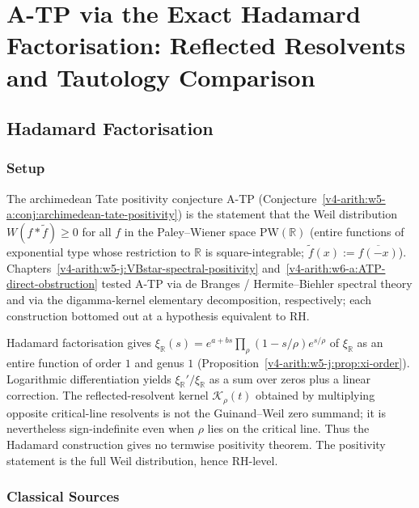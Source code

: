 \chapter{A-TP via the Exact Hadamard Factorisation: Reflected Resolvents and Tautology Comparison}
\label{v4-arith:w7-g:ATP-Hadamard}

\section{Hadamard Factorisation}
\label{v4-arith:w7-g:context}

\subsection{Setup}
\label{v4-arith:w7-g:context:obstruction}

The archimedean Tate positivity conjecture A-TP
(Conjecture~\ref{v4-arith:w5-a:conj:archimedean-tate-positivity}) is the
statement that the Weil distribution \(W(f*\widetilde{f})\geq 0\) for
all \(f\) in the Paley--Wiener space \(\mathrm{PW}(\mathbb{R})\) (entire
functions of exponential type whose restriction to \(\mathbb{R}\) is
square-integrable; \(\widetilde{f}(x):=\overline{f(-x)}\)). Chapters~\ref{v4-arith:w5-j:VBstar-spectral-positivity}
and~\ref{v4-arith:w6-a:ATP-direct-obstruction} tested A-TP via de Branges
/ Hermite--Biehler spectral theory and via the digamma-kernel elementary
decomposition, respectively; each construction bottomed out at a hypothesis
equivalent to RH.

Hadamard factorisation gives
\(\xi_{\mathbb{R}}(s)=e^{a+bs}\prod_{\rho}(1-s/\rho)e^{s/\rho}\)
of \(\xi_{\mathbb{R}}\) as an entire function of order \(1\) and genus \(1\)
(Proposition~\ref{v4-arith:w5-j:prop:xi-order}). Logarithmic differentiation
yields \(\xi_{\mathbb{R}}'/\xi_{\mathbb{R}}\) as a sum over zeros plus a
linear correction. The reflected-resolvent kernel
\(\mathcal{K}_{\rho}(t)\) obtained by multiplying opposite critical-line
resolvents is not the Guinand--Weil zero summand; it is nevertheless
sign-indefinite even when \(\rho\) lies on the critical line. Thus the
Hadamard construction gives no termwise positivity theorem. The
positivity statement is the full Weil distribution, hence RH-level.

\subsection{Classical Sources}
\label{v4-arith:w7-g:sources}

